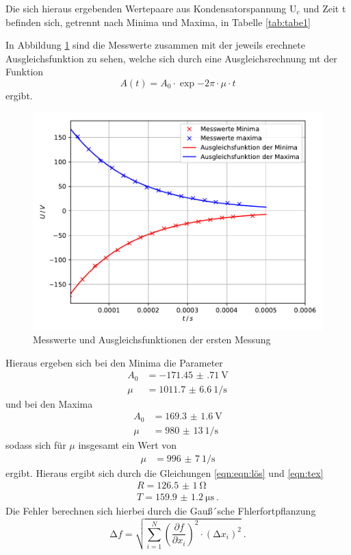 \noindent Die sich hieraus ergebenden Wertepaare aus Kondensatorspannung $\text{U}_c$
und Zeit t befinden sich, getrennt nach Minima und Maxima, in Tabelle \ref{tab:tabe1}



\noindent In Abbildung \ref{fig:plot1} sind die Messwerte zusammen mit der jeweils erechnete Ausgleichsfunktion
zu sehen, welche sich durch eine Ausgleichsrechnung mt der Funktion
\begin{equation}
  A(t)= A_0 \cdot \exp{-2\pi \cdot \mu \cdot t}
\end{equation}
ergibt.
\begin{figure}[H]
  \centering
  \includegraphics{plot1.pdf}
  \caption{Messwerte und Ausgleichsfunktionen der ersten Messung}
  \label{fig:plot1}
\end{figure}

\noindent Hieraus ergeben sich bei den Minima die Parameter
\begin{align*}
  A_0 &= \SI{-171.45(71)}{\volt} \\
  \mu&= \SI{1011.7(66)}{1\per\second}
\end{align*}
und bei den Maxima
\begin{align*}
  A_0 &= \SI{169.3(16)}{\volt} \\
  \mu&= \SI{980(13)}{1\per\second}
\end{align*}
sodass sich für $ \mu $ insgesamt ein Wert von
\begin{align*}
  \mu &= \SI{996(7)}{1\per\second}
\end{align*}
ergibt.
Hieraus ergibt sich durch die Gleichungen \ref{eqn:eqn:lös} und \ref{eqn:tex}
\begin{align*}
  R= \SI{126.5(10)}{\ohm} \\
  T= \SI{159.9(12)}{\micro\second} \: .
\end{align*}
Die Fehler berechnen sich hierbei durch die Gauß´sche Fhlerfortpflanzung
\begin{equation}
  \increment f = \sqrt{ \sum_{i=1}^N \left( \frac{\partial f}{\partial x_i}\right)^2
  \cdot (\increment x_i)^2  } \: .
  \label{eqn:gaus}
\end{equation}
